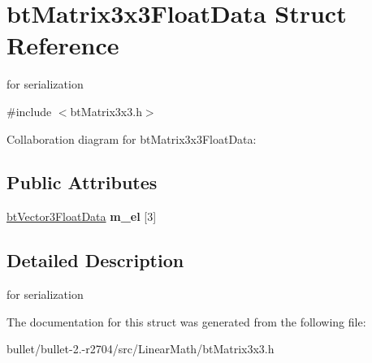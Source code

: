 \hypertarget{structbt_matrix3x3_float_data}{\section{bt\+Matrix3x3\+Float\+Data Struct Reference}
\label{structbt_matrix3x3_float_data}
}


for serialization  




{\ttfamily \#include $<$bt\+Matrix3x3.\+h$>$}



Collaboration diagram for bt\+Matrix3x3\+Float\+Data\+:
\subsection*{Public Attributes}
\begin{DoxyCompactItemize}
\item 
\hypertarget{structbt_matrix3x3_float_data_a6bbe2f1bd684320726a0cf4df3cfd55a}{\hyperlink{structbt_vector3_float_data}{bt\+Vector3\+Float\+Data} {\bfseries m\+\_\+el} \mbox{[}3\mbox{]}}\label{structbt_matrix3x3_float_data_a6bbe2f1bd684320726a0cf4df3cfd55a}

\end{DoxyCompactItemize}


\subsection{Detailed Description}
for serialization 

The documentation for this struct was generated from the following file\+:\begin{DoxyCompactItemize}
\item 
bullet/bullet-\/2.-\/r2704/src/\+Linear\+Math/bt\+Matrix3x3.\+h\end{DoxyCompactItemize}
